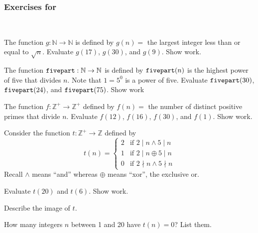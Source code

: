 
\subsubsection*{Exercises for  \subnumberfn}

\begin{exer}[\exerP] %
\label{exer_number_fn_readnew}
~
    \begin{exerpart}
        \item The function $g: \mathbb{N} \to \mathbb{N}$ is defined by $g(n)=$ the largest integer less than or equal to $\sqrt{n}$. Evaluate $g(17)$, $g(30)$, and $g(9)$. Show work.
        \item The function $\texttt{fivepart}: \mathbb{N} \to \mathbb{N}$ is defined by $\texttt{fivepart}(n)$ is the highest power of five that divides $n$. Note that $1 = 5^0$ is a power of five. Evaluate $\texttt{fivepart}(30)$, $\texttt{fivepart}(24)$, and $\texttt{fivepart}(75)$. Show work
        \item  The function $f:\mathbb{Z}^+ \to \mathbb{Z}^+$ defined by $f(n)=$ the number of distinct positive primes that divide $n$. Evaluate $f(12)$, $f(16)$, $f(30)$, and $f(1)$. Show work.
    \end{exerpart}
\end{exer}

\begin{exer}[\exerP] %
\label{exer_fn_mult2_mult5}  
    Consider the function $t: \mathbb{Z}^+ \to \mathbb{Z}$ defined by 
        $$t(n)= \left\{ \begin{array} {cl}
            2 & \text{if } 2 \mid n \land 5 \mid n \\
            1 & \text{if } 2 \mid n \oplus 5 \mid n \\
            0 & \text{if } 2 \nmid n \land 5 \nmid n
        \end{array} \right.$$
    Recall $\land$ means ``and'' whereas $\oplus$ means ``xor'', the exclusive or.
        \begin{exerpart}
            \item Evaluate $t(20)$ and $t(6)$.  Show work.
            \item Describe the image of $t$.
            \item How many integers $n$ between 1 and 20 have $t(n) = 0$?  List them.
        \end{exerpart}
\end{exer}

